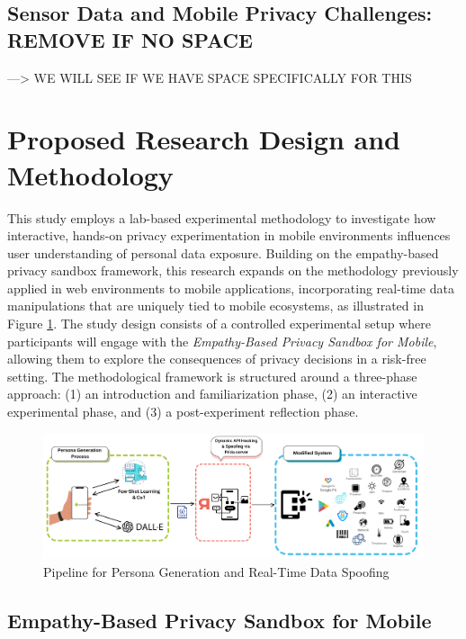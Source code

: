 \documentclass[acmlarge, nonacm]{acmart}
\begin{document}
\subsection{Sensor Data and Mobile Privacy Challenges: REMOVE IF NO SPACE}
 ---> WE WILL SEE IF WE HAVE SPACE SPECIFICALLY FOR THIS

\section{Proposed Research Design and Methodology}
This study employs a lab-based experimental methodology to investigate how interactive, hands-on privacy experimentation in mobile environments influences user understanding of personal data exposure. Building on the empathy-based privacy sandbox framework, this research expands on the methodology previously applied in web environments \cite{Chaoran2023EmpathySandbox} to mobile applications, incorporating real-time data manipulations that are uniquely tied to mobile ecosystems, as illustrated in Figure \ref{fig:methodology}. The study design consists of a controlled experimental setup where participants will engage with the \textit{Empathy-Based Privacy Sandbox for Mobile}, allowing them to explore the consequences of privacy decisions in a risk-free setting. The methodological framework is structured around a three-phase approach: (1) an introduction and familiarization phase, (2) an interactive experimental phase, and (3) a post-experiment reflection phase.

\begin{figure}[htbp]
    \centering
    \includegraphics[width=\textwidth]{figure-2-methodology.png} 
    \caption{Pipeline for Persona Generation and Real-Time Data Spoofing}
    \label{fig:methodology}
\end{figure}

\subsection{Empathy-Based Privacy Sandbox for Mobile}
\end{document}
